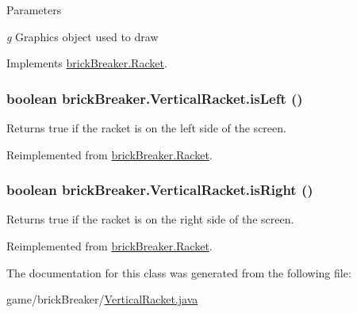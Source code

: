 \begin{DoxyParams}{Parameters}
\item[{\em g}]Graphics object used to draw \end{DoxyParams}


Implements \hyperlink{classbrick_breaker_1_1_racket}{brickBreaker.Racket}.

\hypertarget{classbrick_breaker_1_1_vertical_racket_aa1af985933bd997bba1951e38107a5a5}{
\subsubsection[{isLeft}]{\setlength{\rightskip}{0pt plus 5cm}boolean brickBreaker.VerticalRacket.isLeft ()}}
\label{classbrick_breaker_1_1_vertical_racket_aa1af985933bd997bba1951e38107a5a5}
Returns true if the racket is on the left side of the screen. 

Reimplemented from \hyperlink{classbrick_breaker_1_1_racket}{brickBreaker.Racket}.

\hypertarget{classbrick_breaker_1_1_vertical_racket_ad8c73b81712009be68fa497c48b71012}{
\subsubsection[{isRight}]{\setlength{\rightskip}{0pt plus 5cm}boolean brickBreaker.VerticalRacket.isRight ()}}
\label{classbrick_breaker_1_1_vertical_racket_ad8c73b81712009be68fa497c48b71012}
Returns true if the racket is on the right side of the screen. 

Reimplemented from \hyperlink{classbrick_breaker_1_1_racket}{brickBreaker.Racket}.



The documentation for this class was generated from the following file:\begin{DoxyCompactItemize}
\item 
game/brickBreaker/\hyperlink{_vertical_racket_8java}{VerticalRacket.java}\end{DoxyCompactItemize}
